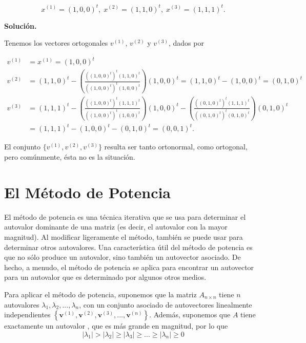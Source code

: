 \documentclass{report}
\numberwithin{subsection}{section} %
\begin{document}
    $$x^{(1)} = (1, 0, 0)^t, \; x^{(2)} = (1, 1, 0)^t, \; x^{(3)} = (1, 1, 1)^t.$$

    {\bf Solución.}

    Tenemos los vectores ortogonales $v^{(1)}$, $v^{(2)}$ y $v^{(3)}$, dados por

    \begin{align*}
        v^{(1)} &= x^{(1)} = (1, 0, 0)^t \\
        v^{(2)} &= (1, 1, 0)^t - \left(\frac{((1, 0, 0)^t)^t (1, 1, 0)^t}{((1, 0, 0)^t)^t (1, 0, 0)^t}\right) (1, 0, 0)^t = (1, 1, 0)^t - (1, 0, 0)^t = (0, 1, 0)^t \\
        v^{(3)} &= (1, 1, 1)^t - \left(\frac{((1, 0, 0)^t)^t (1, 1, 1)^t}{((1, 0, 0)^t)^t (1, 0, 0)^t}\right)(1, 0, 0)^t - \left(\frac{((0, 1, 0)^t)^t (1, 1, 1)^t}{((0, 1, 0)^t)^t (0, 1, 0)^t}\right)(0, 1, 0)^t \\
        &= (1, 1, 1)^t - (1, 0, 0)^t - (0, 1, 0)^t = (0, 0, 1)^t.
    \end{align*}

    El conjunto $\{v^{(1)}, v^{(2)}, v^{(3)}\}$ resulta ser tanto ortonormal, como ortogonal, pero comúnmente, ésta no es la situación.

\section{\textnormal{El Método de Potencia}}

El método de potencia es una técnica iterativa que se usa para determinar el autovalor dominante de una matriz (es decir, el autovalor con la mayor magnitud). Al modificar ligeramente el método, también se puede usar para determinar otros autovalores. Una característica útil del método de potencia es que no sólo produce un autovalor, sino también un autovector asociado. De hecho, a menudo, el método de potencia se aplica para encontrar un autovector para un autovalor que es determinado por algunos otros medios.

Para aplicar el método de potencia, suponemos que la matriz $A_{n\times n}$ tiene $n$ autovalores $\lambda_{1}, \lambda_{2}, ..., \lambda_{n}$, con un conjunto asociado de autovectores linealmente independientes $\left\{ \textbf{v}^{\left( 1 \right)}, \textbf{v}^{\left( 2 \right)}, \textbf{v}^{\left( 3 \right)}, ..., \textbf{v}^{\left( n \right)} \right\}$. Además, suponemos que $A$ tiene exactamente un autovalor , que es más grande en magnitud, por lo que
\begin{equation*}
\left| \lambda_{1} \right| > \left| \lambda_{2} \right| \ge \left| \lambda_{3} \right| \ge ... \ge \left| \lambda_{n} \right| \ge 0
\end{equation*}
\end{document}
